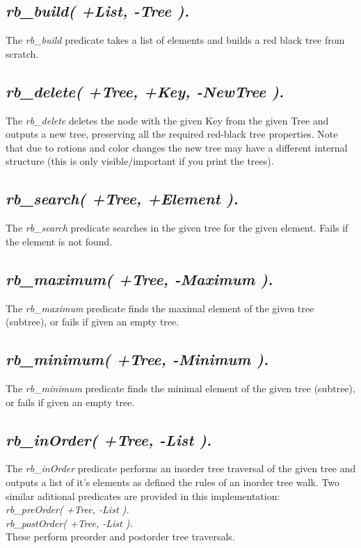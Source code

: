 \documentclass{article}
\newcommand{\inlinecode}[1]{\textit{#1}}
\begin{document}
\subsection{\inlinecode{rb\_build( +List, -Tree ).}}
The \inlinecode{rb\_build} predicate takes a list of elements and builds a red black tree from scratch.

\subsection{\inlinecode{rb\_delete( +Tree, +Key, -NewTree ).}}
The \inlinecode{rb\_delete} deletes the node with the given Key from the given Tree and outputs a new tree, preserving all the required red-black tree properties. Note that due to rotions and color changes the new tree may have a different internal structure (this is only visible/important if you print the trees).

\subsection{\inlinecode{rb\_search( +Tree, +Element ).}}
The \inlinecode{rb\_search} predicate searches in the given tree for the given element. Fails if the element is not found.

\subsection{\inlinecode{rb\_maximum( +Tree, -Maximum ).}}
The \inlinecode{rb\_maximum} predicate finds the maximal element of the given tree (subtree), or fails if given an empty tree.

\subsection{\inlinecode{rb\_minimum( +Tree, -Minimum ).}}
The \inlinecode{rb\_minimum} predicate finds the minimal element of the given tree (subtree), or fails if given an empty tree.

\subsection{\inlinecode{rb\_inOrder( +Tree, -List ).}}
The \inlinecode{rb\_inOrder} predicate performs an inorder tree traversal of the given tree and outputs a list of it's elements as defined the rules of an inorder tree walk.
Two similar aditional predicates are provided in this implementation:\\
\inlinecode{rb\_preOrder( +Tree, -List ).}\\
\inlinecode{rb\_postOrder( +Tree, -List ).}\\
These perform preorder and postorder tree traversals.
\end{document}
